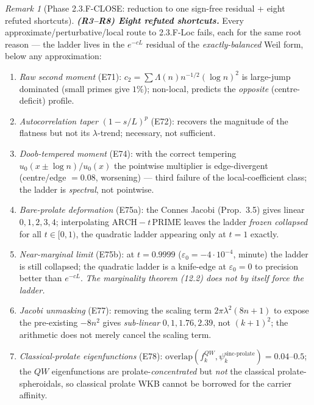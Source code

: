 \documentclass[11pt]{amsart}
\theoremstyle{definition}
\theoremstyle{remark}
\newtheorem{remark}[theorem]{Remark}
\newcommand{\ve}{\varepsilon}
\begin{document}
\begin{remark}[Phase 2.3.F-CLOSE: reduction to one sign-free residual + eight refuted shortcuts]
\emph{\textbf{(R3--R8) Eight refuted shortcuts.}} Every approximate/perturbative/local route to 2.3.F-Loc fails, each for the same root reason --- the ladder lives in the $e^{-cL}$ residual of the \emph{exactly-balanced} Weil form, below any approximation:
\begin{enumerate}\setlength\itemsep{0pt}
\item[(R3)] \emph{Raw second moment} (E71): $c_2=\sum\Lambda(n)n^{-1/2}(\log n)^2$ is large-jump dominated (small primes give $1\%$); non-local, predicts the \emph{opposite} (centre-deficit) profile.
\item[(R4)] \emph{Autocorrelation taper} $(1-s/L)^p$ (E72): recovers the magnitude of the flatness but not its $\lambda$-trend; necessary, not sufficient.
\item[(R5)] \emph{Doob-tempered moment} (E74): with the correct tempering $u_0(x\pm\log n)/u_0(x)$ the pointwise multiplier is edge-divergent (centre/edge $=0.08$, worsening) --- third failure of the local-coefficient class; the ladder is \emph{spectral}, not pointwise.
\item[(R6)] \emph{Bare-prolate deformation} (E75a): the Connes Jacobi (Prop.~3.5) gives linear $0,1,2,3,4$; interpolating $\mathrm{ARCH}-t\,\mathrm{PRIME}$ leaves the ladder \emph{frozen collapsed} for all $t\in[0,1)$, the quadratic ladder appearing only at $t=1$ exactly.
\item[(R7)] \emph{Near-marginal limit} (E75b): at $t=0.9999$ ($\ve_0=-4\!\cdot\!10^{-4}$, minute) the ladder is still collapsed; the quadratic ladder is a knife-edge at $\ve_0=0$ to precision better than $e^{-cL}$. \emph{The marginality theorem (12.2) does not by itself force the ladder.}
\item[(R8a)] \emph{Jacobi unmasking} (E77): removing the scaling term $2\pi\lambda^2(8n+1)$ to expose the pre-existing $-8n^2$ gives \emph{sub-linear} $0,1,1.76,2.39$, not $(k+1)^2$; the arithmetic does not merely cancel the scaling term.
\item[(R8b)] \emph{Classical-prolate eigenfunctions} (E78): $\mathrm{overlap}(f_k^{QW},\psi_k^{\text{sinc-prolate}})=0.04$--$0.5$; the $QW$ eigenfunctions are prolate-\emph{concentrated} but \emph{not} the classical prolate-spheroidals, so classical prolate WKB cannot be borrowed for the carrier affinity.
\end{enumerate}


\end{remark}
\end{document}
